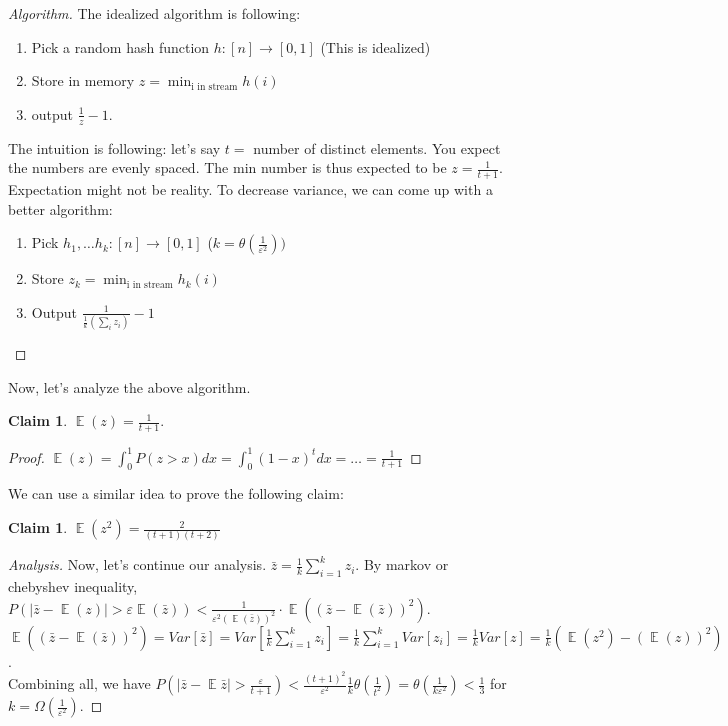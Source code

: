 \documentclass[11pt]{article}
\newcommand{\eps}{\epsilon}
\renewcommand{\epsilon}{\varepsilon}
\newcommand{\<}{\langle}
\renewcommand{\>}{\rangle}
\theoremstyle{definition}
\numberwithin{problem}{section}
\DeclareMathOperator*{\E}{\mathbb{E}}
\newtheorem{claim}[theorem]{Claim}
\begin{document}
          \begin{proof}[Algorithm]
            The idealized algorithm is following:
          	\begin{enumerate}
            	\item Pick a random hash function $h:[n] \rightarrow [0, 1]$ (This is idealized)
                \item Store in memory $z = \min_{\text{i in stream}} h(i)$
                \item output $\frac{1}{z} - 1$.
            \end{enumerate}
            The intuition is following: let's say $t = $ number of distinct elements. You expect the numbers are evenly spaced. The min number is thus expected to be $z=\frac{1}{t+1}$. \\
            Expectation might not be reality. To decrease variance, we can come up with a better algorithm:
           \begin{enumerate}
           	\item Pick $h_1, \ldots h_k: [n] \rightarrow [0, 1]$ ($k = \theta (\frac{1}{\eps^2}))$
            \item Store $z_k = \min_{\text{i in stream}} h_k(i)$
            \item Output $\frac{1}{\frac{1}{k}(\sum_i z_i)} - 1$
           \end{enumerate}
          \end{proof}
          Now, let's analyze the above algorithm.
          \begin{claim}
          $\E(z) = \frac{1}{t+1}$.
          \end{claim}
          \begin{proof}
          	$\E(z) = \int_{0}^{1} P(z > x)dx = \int_{0}^{1}(1 - x)^tdx = \ldots = \frac{1}{t + 1}$
          \end{proof}
          We can use a similar idea to prove the following claim:
          \begin{claim}
          $\E(z^2) = \frac{2}{(t + 1)(t + 2)}$
          \end{claim}
          \begin{proof}[Analysis]
          Now, let's continue our analysis.
          $\bar{z} = \frac{1}{k} \sum_{i=1}^{k}z_i$. By markov or chebyshev inequality, $P(|\bar{z} - \E(z)| > \eps \E(\bar{z})) < \frac{1}{\eps^2(\E(\bar{z}))^2}\cdot \E((\bar{z}-\E(\bar{z}))^2)$. \\
          $ \E((\bar{z}-\E(\bar{z}))^2) = Var[\bar{z}] = Var[\frac{1}{k}\sum_{i=1}^{k}z_i] = \frac{1}{k}\sum_{i=1}^{k}Var[z_i] = \frac{1}{k}Var[z] = \frac{1}{k}(\E(z^2) - (\E(z))^2)$.\\
          Combining all, we have $P(|\bar{z}-\E\bar{z}| > \frac{\eps}{t+1}) < \frac{(t+1)^2}{\eps^2}\frac{1}{k} \theta(\frac{1}{t^2}) = \theta(\frac{1}{k\eps^2}) < \frac{1}{3}$ for $k = \Omega(\frac{1}{\eps^2})$.
          \end{proof}
\end{document}
